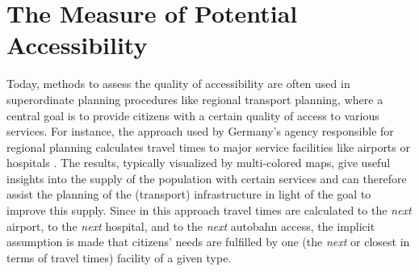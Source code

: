 \section{The Measure of Potential Accessibility}
\label{sec:potential}
Today, methods to assess the quality of accessibility are often used in superordinate planning procedures like 
regional transport planning, where a central goal is to provide citizens with a certain quality of access to
various services. For instance, the approach used by Germany's agency responsible for regional planning calculates
travel times to major service facilities like airports or hospitals \citep{BBSRErreichbarkeitsmodell}. The results,
typically visualized by multi-colored maps, give useful insights 
into the supply of the population with certain services and can therefore assist the planning of the (transport) 
infrastructure in light of the goal to improve this supply.
Since in this approach travel times are calculated to the \emph{next} airport, to the \emph{next} hospital, and
to the \emph{next} autobahn access, the implicit assumption is made that citizens' needs are fulfilled by
one (\ie the \emph{next} or closest in terms of travel times) facility of a given type.


